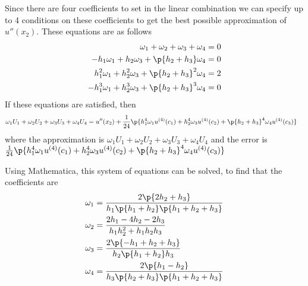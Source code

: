 \documentclass[11pt, oneside]{article}
\begin{document}
\begin{enumerate}
        Since there are four coefficients to set in the linear combination we can
        specify up to 4 conditions on these coefficients to get the best possible
        approximation of $u''(x_2)$.
        These equations are as follows
        \begin{align*}
            \omega_1 + \omega_2 + \omega_3 + \omega_4 &= 0 \\
            -h_1 \omega_1 + h_2 \omega_3 + \p{h_2 + h_3} \omega_4 &= 0 \\
            h_1^2 \omega_1 + h_2^2 \omega_3 + \p{h_2 + h_3}^2 \omega_4 &= 2 \\
            -h_1^3 \omega_1 + h_2^3 \omega_3 + \p{h_2 + h_3}^3 \omega_4 &= 0
        \end{align*}
        If these equations are satisfied, then
        \begin{align*}
            \omega_1 U_1 + \omega_2 U_2 + \omega_3 U_3 + \omega_4 U_4 &= u''(x_2) + \frac{1}{24}\p{h_1^4 \omega_1 u^{(4)}(c_1) + h_2^4 \omega_3 u^{(4)}(c_2)+ \p{h_2 + h_3}^4 \omega_4 u^{(4)}(c_3)}
        \end{align*}
        where the approximation is $\omega_1 U_1 + \omega_2 U_2 + \omega_3 U_3 + \omega_4 U_4$
        and the error is $\frac{1}{24}\p{h_1^4 \omega_1 u^{(4)}(c_1) + h_2^4 \omega_3 u^{(4)}(c_2)+ \p{h_2 + h_3}^4 \omega_4 u^{(4)}(c_3)}$

        Using Mathematica, this system of equations can be solved, to find that
        the coefficients are
        \begin{align*}
            \omega_1 &= \frac{2\p{2 h_2 + h_3}}{h_1 \p{h_1 + h_2}\p{h_1 + h_2 + h_3}} \\
            \omega_2 &= \frac{2h_1 - 4 h_2 - 2 h_3}{h_1 h_2^2 + h_1 h_2 h_3} \\
            \omega_3 &= \frac{2\p{-h_1 + h_2 + h_3}}{h_2\p{h_1 + h_2} h_3} \\
            \omega_4 &= \frac{2\p{h_1 - h_2}}{h_3\p{h_2 + h_3}\p{h_1 + h_2 + h_3}}
        \end{align*}


\end{enumerate}
\end{document}
